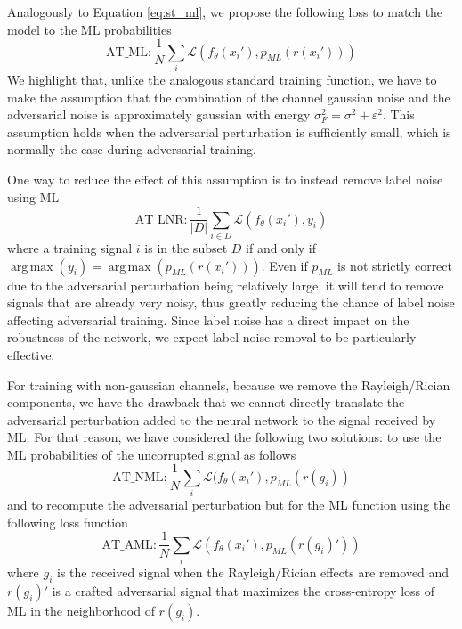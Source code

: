 \documentclass[conference]{IEEEtran}
\newcommand{\Ls}{\mathcal{L}}
\DeclareMathOperator*{\argmax}{arg\,max}
\begin{document}
Analogously to Equation \ref{eq:st_ml}, we propose the following loss to match the model to the ML probabilities
\begin{equation}
    \text{AT\_ML} : \dfrac{1}{N}\sum_{i}\Ls(f_{\theta}(x_i'), p_{ML}(r(x_i')))
\end{equation}
We highlight that, unlike the analogous standard training function, we have to make the assumption that the combination of the channel gaussian noise and the adversarial noise is approximately gaussian with energy $\sigma_F^{2} = \sigma^{2} + \varepsilon^{2}$. This assumption holds when the adversarial perturbation is sufficiently small, which is normally the case during adversarial training.

One way to reduce the effect of this assumption is to instead remove label noise using ML
\begin{equation}
    \text{AT\_LNR} : \dfrac{1}{|D|}\sum_{i \in D}\Ls(f_{\theta}(x_i'), y_i)
\end{equation}
where a training signal $i$ is in the subset $D$ if and only if $\argmax(y_i) = \argmax(p_{ML}(r(x_i')))$. Even if $p_{ML}$ is not strictly correct due to the adversarial perturbation being relatively large, it will tend to remove signals that are already very noisy, thus greatly reducing the chance of label noise affecting adversarial training. Since label noise has a direct impact on the robustness of the network, we expect label noise removal to be particularly effective.

For training with non-gaussian channels, because we remove the Rayleigh/Rician components, we have the drawback that we cannot directly translate the adversarial perturbation added to the neural network to the signal received by ML. For that reason, we have considered the following two solutions: to use the ML probabilities of the uncorrupted signal as follows 
\begin{equation}
    \text{AT\_NML} : \dfrac{1}{N}\sum_{i}\Ls(f_{\theta}(x_i'), p_{ML}(r(g_i))
\label{eq:at_nml}
\end{equation}
and to recompute the adversarial perturbation but for the ML function using the following loss function
\begin{equation}
    \text{AT\_AML} : \dfrac{1}{N}\sum_{i}\Ls(f_{\theta}(x_i'), p_{ML}(r(g_i)'))
	\label{eq:at_aml}
\end{equation}
where $g_i$ is the received signal when the Rayleigh/Rician effects are removed and $r(g_i)'$ is a crafted adversarial signal that maximizes the cross-entropy loss of ML in the neighborhood of $r(g_i)$.
\end{document}
